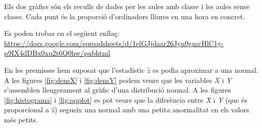 \begin{figure}[h!]
\begin{minipage}{0.45\linewidth}
\end{minipage}
\end{figure}

Els dos gràfics són els reculls de dades per les aules amb classe i les aules sense classe. Cada punt és la proporció d'ordinadors lliures en una hora en concret.

Es poden trobar en el següent enllaç:\\
\url{https://docs.google.com/spreadsheets/d/1elGJjdaar26Jyu9gmvHlC1y-p9IX4dDBx0xu2t6Q0hw/pubhtml}

En les premisses hem suposat que l'estadístic $\hat{z}$ es podia aproximar a una normal. A les figures \ref{fig:densX} i \ref{fig:densY} podem veure que les variables \emph{X} i \emph{Y} s'assemblen lleugerament al gràfic d'una distribució normal. A les figures \ref{fig:histograma} i \ref{fig:qqplot} es pot veure que la diferència entre \emph{X} i \emph{Y} (que és proporcional a $\hat{z}$) segueix una normal amb una petita anormalitat en els valors més petits.

